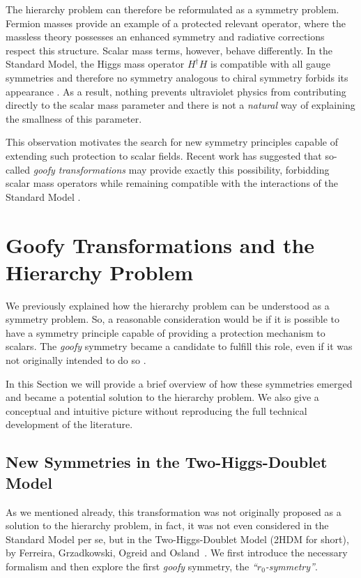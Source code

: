 \documentclass[a4paper, 11pt]{article}
\begin{document}
The hierarchy problem can therefore be reformulated as a symmetry problem. Fermion masses provide an example of a protected relevant operator, where the massless theory possesses an enhanced symmetry and radiative corrections respect this structure. Scalar mass terms, however, behave differently. In the Standard Model, the Higgs mass operator $H^\dagger H$ is compatible with all gauge symmetries and therefore no symmetry analogous to chiral symmetry forbids its appearance \cite{PeskinHierarchy}. As a result, nothing prevents ultraviolet physics from contributing directly to the scalar mass parameter and there is not a \textit{natural} way of explaining the smallness of this parameter.

This observation motivates the search for new symmetry principles capable of extending such protection to scalar fields. Recent work has suggested that so-called \emph{goofy transformations} may provide exactly this possibility, forbidding scalar mass operators while remaining compatible with the interactions of the Standard Model \cite{Trautner_goofy1}. 

\section{Goofy Transformations and the Hierarchy Problem}
\label{sec:goofy}

We previously explained how the hierarchy problem can be understood as a symmetry problem. So, a reasonable consideration would be if it is possible to have a symmetry principle capable of providing a protection mechanism to scalars. The \textit{goofy} symmetry became a candidate to fulfill this role, even if it was not originally intended to do so \cite{Trautner_goofy1,goofy2}.

In this Section we will provide a brief overview of how these symmetries emerged and became a potential solution to the hierarchy problem. We also give a conceptual and intuitive picture without reproducing the full technical development of the literature. 


\subsection{New Symmetries in the Two-Higgs-Doublet Model}
\label{sec:fgoo}

As we mentioned already, this transformation was not originally proposed as a solution to the hierarchy problem, in fact, it was not even considered in the Standard Model per se, but in the Two-Higgs-Doublet Model (2HDM for short), by Ferreira, Grzadkowski, Ogreid and Osland~\cite{2HDM}. We first introduce the necessary formalism and then explore the first \textit{goofy} symmetry, the \textit{``$r_0$-symmetry''}.
\end{document}
